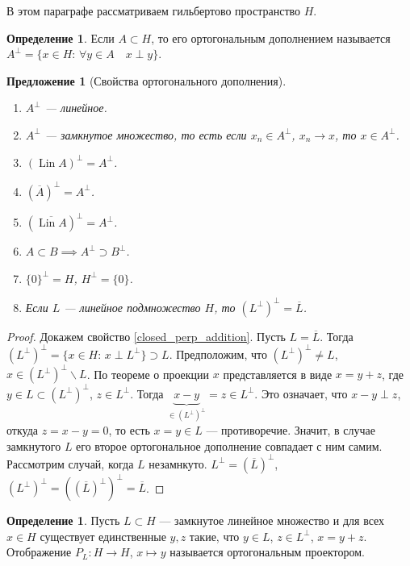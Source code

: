 \documentclass[11pt,openany,a4paper]{scrartcl}
\theoremstyle{plain}
\newtheorem{proposition}[theorem]{Предложение}
\theoremstyle{definition}
\newtheorem{definition}[theorem]{Определение}
\newcommand\ol{\overline}
\DeclareMathOperator{\Lin}{Lin}
\begin{document}
В этом параграфе рассматриваем гильбертово пространство $H$.

\begin{definition}
    Если $A \subset H$, то его ортогональным дополнением называется
    $A^\perp = \{x \in H:\,\forall y \in A\quad x\perp y\}$.
\end{definition}
\begin{proposition}[Свойства ортогонального дополнения]
\mbox{}
    \begin{enumerate}
        \item $A^\perp$ — линейное.
        \item $A^\perp$ — замкнутое множество, то есть если $x_n \in A^\perp$,
        $x_n \to x$, то $x \in A^\perp$.
        \item $(\Lin A)^\perp = A^\perp$.
        \item $(\ol A)^\perp = A^\perp$.
        \item $(\ol{\Lin A})^\perp = A^\perp$.
        \item $A\subset B \implies A^\perp \supset B^\perp$.
        \item $\{0\}^\perp = H$, $H^\perp = \{0\}$.
        \item\label{closed_perp_addition} Если $L$ — линейное подмножество $H$,
        то $(L^\perp)^\perp = \ol L$.
    \end{enumerate}
\end{proposition}
\begin{proof}
    Докажем свойство \ref{closed_perp_addition}. Пусть $L = \ol L$. Тогда
    $(L^\perp)^\perp = \{x \in H:\, x\perp L^\perp\} \supset L$.
    Предположим, что
    $(L^\perp)^\perp \neq L$, $x \in (L^\perp)^\perp \backslash L$.
    По теореме о проекции $x$ представляется в виде $x = y + z$, где
    $y \in L \subset (L^\perp)^\perp$,
    $z \in L^\perp$. Тогда
    $\underbrace{x - y}_{\in (L^\perp)^\perp} = z \in L^\perp$. Это означает,
    что $x-y \perp z$, откуда $z = x - y = 0$, то есть $x = y \in L$ — 
    противоречие. Значит, в случае замкнутого $L$ его второе ортогональное 
    дополнение совпадает с ним самим. Рассмотрим случай, когда $L$ незамнкуто.
    $L^\perp = (\ol L)^\perp$, $(L^\perp)^\perp = ((\ol L)^\perp)^\perp = \ol L$.
\end{proof}

\begin{definition}
    Пусть $L \subset H$ — замкнутое линейное множество и для всех $x \in H$
    существует единственные $y, z$ такие, что $y \in L$, $z \in L^\perp$,
    $x = y + z$. Отображение $P_L: H \to H$, $x \mapsto y$
    называется ортогональным проектором.
\end{definition}
\end{document}
